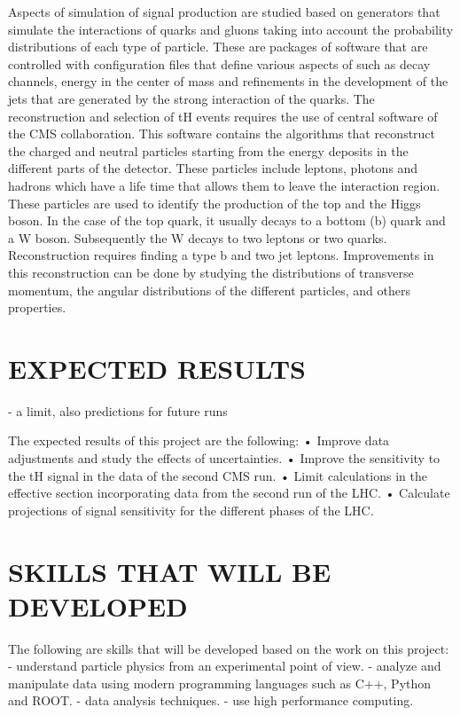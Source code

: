 \documentclass[final,3p]{CSP}
\begin{document}
\onehalfspacing Aspects of simulation of signal production are studied based on generators that simulate the 
interactions of quarks and gluons taking into account the probability distributions of each 
type of particle. These are packages of software that are controlled with configuration files 
that define various aspects of such as decay channels, energy in the center of mass and 
refinements in the development of the jets that are generated by the strong interaction of 
the quarks. The reconstruction and selection of tH events requires the use of central 
software of the CMS collaboration. This software contains the algorithms that reconstruct the 
charged and neutral particles starting from the energy deposits in the different parts of the 
detector. These particles include leptons, photons and hadrons which have a life time that 
allows them to leave the interaction region. These particles are used to identify the 
production of the top and the Higgs boson. In the case of the top quark, it usually decays to 
a bottom (b) quark and a W boson. Subsequently the W decays to two leptons or two quarks. 
Reconstruction requires finding a type b and two jet leptons. Improvements in this 
reconstruction can be done by studying the distributions of transverse momentum, the angular 
distributions of the different particles, and others properties.

\section{EXPECTED RESULTS}
- a limit, also predictions for future runs

The expected results of this project are the following:
• Improve data adjustments and study the effects of uncertainties.
• Improve the sensitivity to the tH signal in the data of the second CMS run.
• Limit calculations in the effective section incorporating data from the second
run of the LHC.
• Calculate projections of signal sensitivity for the different phases of the LHC.


\cleardoublepage



\appendix
\section{SKILLS THAT WILL BE DEVELOPED}
The following are skills that will be developed based on the work on this project:
- understand particle physics from an experimental point of view.
- analyze and manipulate data using modern programming languages such as C++, Python and ROOT.
- data analysis techniques.
- use high performance computing.
\end{document}
